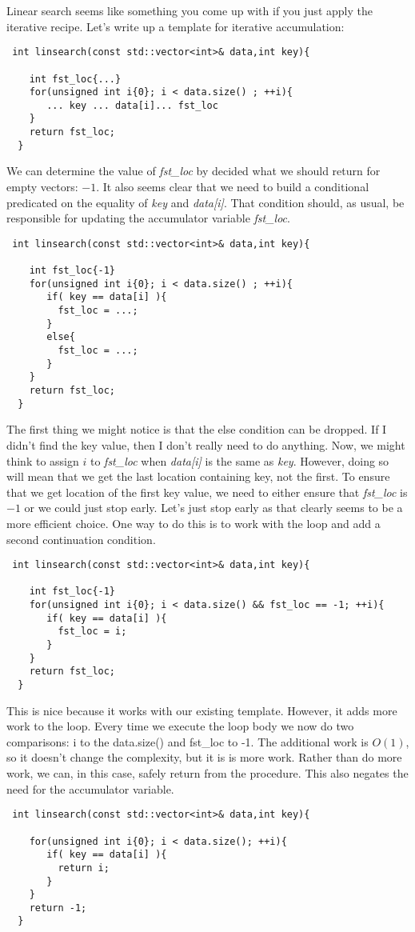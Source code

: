 \documentclass[]{tufte-handout}
\begin{document}
Linear search seems like something you come up with if you just apply the iterative recipe.  Let's write up a template for iterative accumulation:
\begin{verbatim}
 int linsearch(const std::vector<int>& data,int key){
    
    int fst_loc{...}
    for(unsigned int i{0}; i < data.size() ; ++i){
	   ... key ... data[i]... fst_loc
    }
    return fst_loc;
  }
\end{verbatim}
  
We can determine the value of \textit{fst\_loc} by decided what we should return for empty vectors: $-1$.  It also seems clear that we need to build a conditional predicated on the equality of \textit{key} and \textit{data[i]}.  That condition should, as usual, be responsible for updating the accumulator variable \textit{fst\_loc}.

\begin{verbatim}
 int linsearch(const std::vector<int>& data,int key){
    
    int fst_loc{-1}
    for(unsigned int i{0}; i < data.size() ; ++i){
	   if( key == data[i] ){
	     fst_loc = ...;
	   }
	   else{
	     fst_loc = ...;
	   }
    }
    return fst_loc;
  }
\end{verbatim}

The first thing we might notice is that the else condition can be dropped. If I didn't find the key value, then I don't really need to do anything. Now, we might think to assign $i$ to \textit{fst\_loc} when \textit{data[i]} is the same as  \textit{key}. However, doing so will mean that we get the last location containing key, not the first. To ensure that we get location of the first key value, we need to either ensure that \textit{fst\_loc} is $-1$ or we could just stop early. Let's just stop early as that clearly seems to be a more efficient choice. One way to do this is to work with the loop and add a second continuation condition.

\begin{verbatim}
 int linsearch(const std::vector<int>& data,int key){
    
    int fst_loc{-1}
    for(unsigned int i{0}; i < data.size() && fst_loc == -1; ++i){
	   if( key == data[i] ){
	     fst_loc = i;
	   }
    }
    return fst_loc;
  }
\end{verbatim}
This is nice because it works with our existing template. However, it adds more work to the loop. Every time we execute the loop body we now do two comparisons: i to the data.size() and fst\_loc to -1. The additional work is $O(1)$, so it doesn't change the complexity, but it is is more work.  Rather than do more work, we can, in this case, safely return from the procedure.  This also negates the need for the accumulator variable. 
\begin{verbatim}
 int linsearch(const std::vector<int>& data,int key){
    
    for(unsigned int i{0}; i < data.size(); ++i){
	   if( key == data[i] ){
	     return i;
	   }
    }
    return -1;
  }
\end{verbatim}
\end{document}
